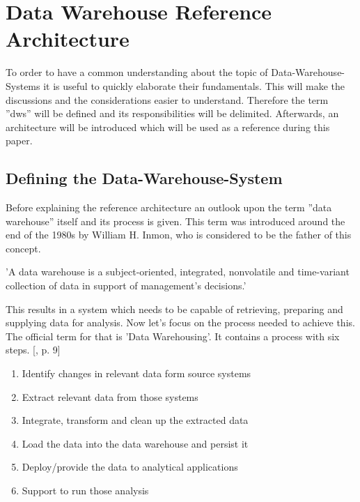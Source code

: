 \section{Data Warehouse Reference Architecture}
\label{sec:referenceArchitecture}
To order to have a common understanding about the topic of Data-Warehouse-Systems it is useful to quickly elaborate their fundamentals. This will make the discussions and the considerations easier to understand.\newline
Therefore the term ''\acrshort{dws}'' will be defined and its responsibilities will be delimited. Afterwards, an architecture will be introduced which will be used as a reference during this paper.

\subsection{Defining the Data-Warehouse-System}
Before explaining the reference architecture an outlook upon the term ''data warehouse'' itself and its process is given.\newline
This term was introduced around the end of the 1980s by William H. Inmon, who is considered to be the father of this concept.
\begin{definition}
'A data warehouse is a subject-oriented, integrated, nonvolatile and time-variant collection of data in support of management's decisions.' \cite{buildingTheDWS}
\end{definition}
This results in a system which needs to be capable of retrieving, preparing and supplying data for analysis.\newline
Now let's focus on the process needed to achieve this. The official term for that is 'Data Warehousing'. It contains a process with six steps. [\cite{dwsRefArchitecture}, p. 9]
\begin{enumerate}
    \item Identify changes in relevant data form source systems
    \item Extract relevant data from those systems
    \item Integrate, transform and clean up the extracted data
    \item Load the data into the data warehouse and persist it
    \item Deploy/provide the data to analytical applications 
    \item Support to run those analysis
\end{enumerate}

